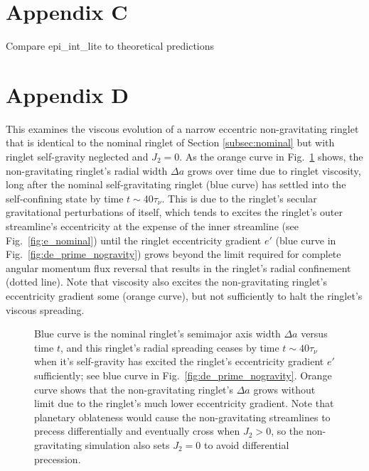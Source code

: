 \documentclass[preprint]{aastex62}
\begin{document}
\section{Appendix C}
\label{sec:Appendix C}

Compare epi\_int\_lite to theoretical predictions

\section{Appendix D}
\label{sec:Appendix D}

This examines the viscous evolution of a narrow eccentric non-gravitating
ringlet that is identical to the nominal ringlet of Section \ref{subsec:nominal} but
with ringlet self-gravity neglected and $J_2=0$.
As the orange curve in Fig.\ \ref{fig:da_nogravity} shows, the non-gravitating ringlet's
radial width $\Delta a$ grows over time due to ringlet viscosity, 
long after the nominal self-gravitating ringlet (blue curve)
has settled into the self-confining state by time $t\sim40\tau_\nu$. This is due to the
ringlet's secular gravitational perturbations of itself,
which tends to excites the ringlet's outer streamline's eccentricity at the expense
of the inner streamline (see Fig.\ \ref{fig:e_nominal}) until the ringlet eccentricity gradient $e'$
(blue curve in Fig.\ \ref{fig:de_prime_nogravity}) grows beyond the
limit required for complete angular momentum flux reversal 
that results in the ringlet's radial confinement (dotted line). 
Note that viscosity also excites the non-gravitating
ringlet's eccentricity gradient some (orange curve), but not sufficiently to halt the ringlet's 
viscous spreading.

\begin{figure}
    \caption{
        \label{fig:da_nogravity}
        Blue curve is the nominal ringlet's semimajor axis width $\Delta a$ versus time $t$,
        and this ringlet's radial spreading ceases by time $t\sim40\tau_\nu$ when it's self-gravity
        has excited the ringlet's eccentricity gradient $e'$ sufficiently; 
        see blue curve in Fig.\ \ref{fig:de_prime_nogravity}. Orange curve shows that
        the non-gravitating ringlet's $\Delta a$ grows without limit due to the ringlet's
        much lower eccentricity gradient. Note that planetary oblateness would
        cause the non-gravitating streamlines to precess differentially and eventually cross
        when $J_2>0$, so the non-gravitating simulation also sets $J_2=0$ 
        to avoid differential precession.
    }
\end{figure}
\end{document}
